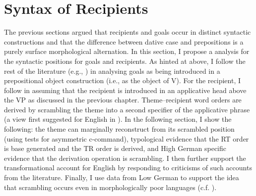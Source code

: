 \section{Syntax of Recipients}\label{sec:synrecp}
The previous sections argued that recipients and goals occur in distinct syntactic constructions and that the difference between dative case and prepositions is a purely surface morphological alternation. In this section, I propose a analysis for the syntactic positions for goals and recipients. As hinted at above, I follow the rest of the literature (e.g., \citet{Jackendoff.1990,Harley.2002,Hallman.2015}) in analysing goals as being introduced in a prepositional object construction (i.e., as the object of V). For the recipient, I follow \cite{McGinnis.1998,Bruening.2010,Bruening.2010b} in assuming that the recipient is introduced in an applicative head above the VP as discussed in the previous chapter. Theme--recipient word orders are derived by scrambling the theme into a second specifier of the applicative phrase (a view first suggested for English in \citet{Takano.1998}). In the following section, I show the following: the theme can marginally reconstruct from its scrambled position (using tests for asymmetric c-command), typological evidence that the RT order is base generated and the TR order is derived, and High German specific evidence that the derivation operation is scrambling. I then further support the transformational account for English by responding to criticisms of such accounts from the literature. Finally, I use data from Low German to support the idea that scrambling occurs even in morphologically poor languages (c.f. \citealt{Weerman.1997}). 
